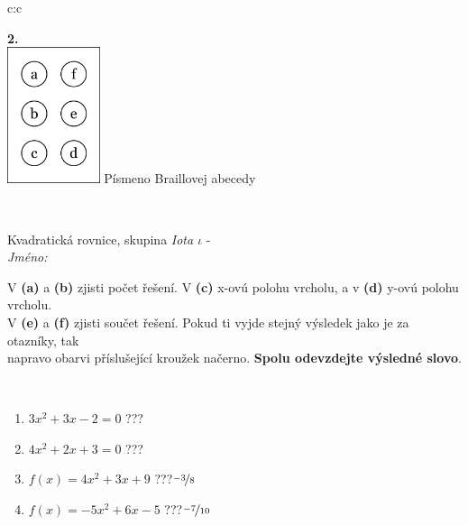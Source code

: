 \documentclass[10pt]{report}
\begin{document}
\begin{tabular}{c:c}
\begin{minipage}[c][104.5mm][t]{0.5\linewidth}
\begin{center}
\begin{minipage}{0.20\linewidth}
\begin{center}
{\Huge\bfseries 2.} \\[2mm]
\includegraphics[height=40mm]{../images/braille.png}
{\small Písmeno Braillovej abecedy}
\end{center}
\end{minipage}
\end{center}
\end{minipage}
\\ \hdashline
\begin{minipage}[c][104.5mm][t]{0.5\linewidth}
\begin{center}
\vspace{7mm}
{\huge Kvadratická rovnice, skupina \textit{Iota $\iota$} -}\\[5mm]
\textit{Jméno:}\phantom{xxxxxxxxxxxxxxxxxxxxxxxxxxxxxxxxxxxxxxxxxxxxxxxxxxxxxxxxxxxxxxxxx}\\[5mm]
\begin{minipage}{0.95\linewidth}
\begin{center}
V \textbf{(a)} a \textbf{(b)} zjisti počet řešení. V \textbf{(c)} x-ovú polohu vrcholu, a v \textbf{(d)} y-ovú polohu vrcholu.\\V \textbf{(e)} a \textbf{(f)} zjisti součet řešení. Pokud ti vyjde stejný výsledek jako je za otazníky, tak\\napravo obarvi příslušející kroužek načerno. \textbf{Spolu odevzdejte výsledné slovo}.
\end{center}
\end{minipage}
\\[1mm]
\begin{minipage}{0.79\linewidth}
\begin{center}
\begin{varwidth}{\linewidth}
\begin{enumerate}
\Large
\item $3x^2+3x-2=0$\quad \dotfill\; ???\;\dotfill {}
\item $4x^2+2x+3=0$\quad \dotfill\; ???\;\dotfill {}
\item $f(x)=4x^2+3x+9$\quad \dotfill\; ???\;\dotfill \quad $\nicefrac{-3}{8}$
\item $f(x)=-5x^2+6x-5$\quad \dotfill\; ???\;\dotfill \quad $\nicefrac{-7}{10}$

\end{enumerate}
\end{varwidth}
\end{center}
\end{minipage}
\end{center}
\end{minipage}
\end{tabular}
\end{document}
